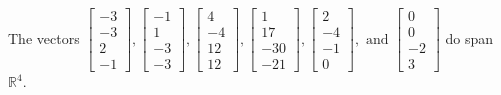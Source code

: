 \begin{exercise}
\begin{exerciseStatement}
  \end{exerciseStatement}
  \begin{exerciseAnswer}
   The vectors \(\left[\begin{array}{r}
-3 \\
-3 \\
2 \\
-1
\end{array}\right] , \left[\begin{array}{r}
-1 \\
1 \\
-3 \\
-3
\end{array}\right] , \left[\begin{array}{r}
4 \\
-4 \\
12 \\
12
\end{array}\right] , \left[\begin{array}{r}
1 \\
17 \\
-30 \\
-21
\end{array}\right] , \left[\begin{array}{r}
2 \\
-4 \\
-1 \\
0
\end{array}\right] , \text{ and } \left[\begin{array}{r}
0 \\
0 \\
-2 \\
3
\end{array}\right]\) 
  	 do  
	span \(\mathbb{R}^4\).
  


  \end{exerciseAnswer}
\end{exercise}